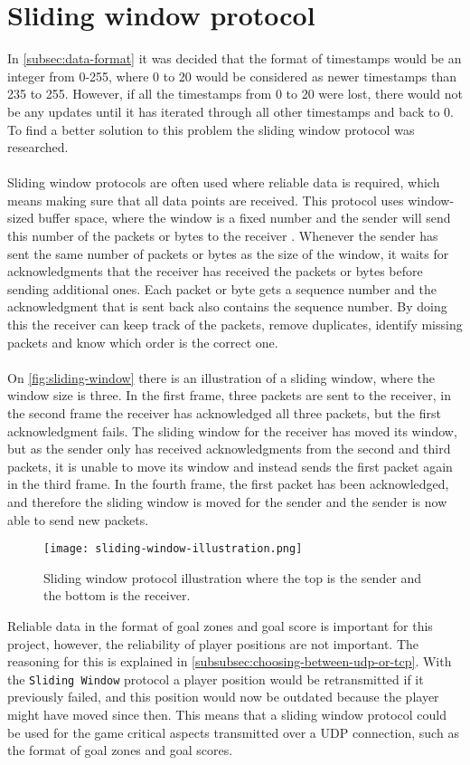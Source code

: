 \section{Sliding window protocol}\label{sec:sliding-window}
In \autoref{subsec:data-format} it was decided that the format of timestamps would be an integer from 0-255, where 0 to 20 would be considered as newer timestamps than 235 to 255.
However, if all the timestamps from 0 to 20 were lost, there would not be any updates until it has iterated through all other timestamps and back to 0.
To find a better solution to this problem the sliding window protocol was researched.
\\\\
Sliding window protocols are often used where reliable data is required, which means making sure that all data points are received.
This protocol uses window-sized buffer space, where the window is a fixed number and the sender will send this number of the packets or bytes to the receiver \cite{design-and-validation-of-computer-protocols}.
Whenever the sender has sent the same number of packets or bytes as the size of the window, it waits for acknowledgments that the receiver has received the packets or bytes before sending additional ones.
Each packet or byte gets a sequence number and the acknowledgment that is sent back also contains the sequence number.
By doing this the receiver can keep track of the packets, remove duplicates, identify missing packets and know which order is the correct one.
\\\\
On \autoref{fig:sliding-window} there is an illustration of a sliding window, where the window size is three.
In the first frame, three packets are sent to the receiver, in the second frame the receiver has acknowledged all three packets, but the first acknowledgment fails.
The sliding window for the receiver has moved its window, but as the sender only has received acknowledgments from the second and third packets, it is unable to move its window and instead sends the first packet again in the third frame.
In the fourth frame, the first packet has been acknowledged, and therefore the sliding window is moved for the sender and the sender is now able to send new packets.
\begin{figure}[H]
    \centering
    \texttt{[image: sliding-window-illustration.png]}
    \caption{Sliding window protocol illustration where the top is the sender and the bottom is the receiver.}
    \label{fig:sliding-window}
\end{figure}
\noindent
Reliable data in the format of goal zones and goal score is important for this project, however, the reliability of player positions are not important.
The reasoning for this is explained in \autoref{subsubsec:choosing-between-udp-or-tcp}.
With the \texttt{Sliding Window} protocol a player position would be retransmitted if it previously failed, and this position would now be outdated because the player might have moved since then.
This means that a sliding window protocol could be used for the game critical aspects transmitted over a UDP connection, such as the format of goal zones and goal scores.